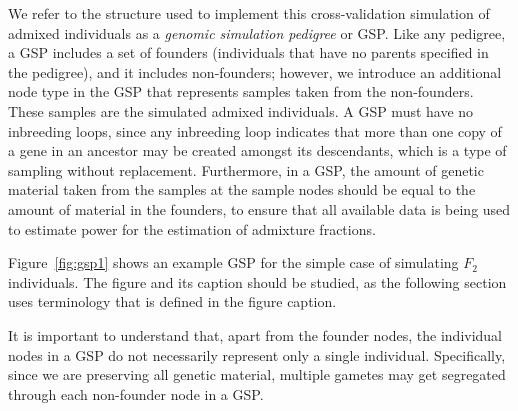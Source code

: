 We refer to the structure used to implement this cross-validation simulation
of admixed individuals as
a {\em genomic simulation pedigree} or GSP.  Like any pedigree,
a GSP includes a set of founders (individuals that have no parents specified in the
pedigree), and it includes non-founders; however, we introduce an additional node
type in the GSP that represents samples taken from the non-founders. These samples
are the simulated admixed individuals.  A GSP must have no inbreeding loops, since
any inbreeding loop indicates that more than one copy of a gene in an ancestor may
be created amongst its descendants, which is a type of sampling without
replacement.  Furthermore, in a GSP, the amount of genetic material taken from the
samples at the sample nodes should be equal to the amount of material in the founders,
to ensure that all available data is being used to estimate power for the estimation of
admixture fractions.

Figure~\ref{fig:gsp1} shows an example GSP for the simple case
of simulating $F_2$ individuals. The figure and its caption
should be studied, as the following section
uses terminology that is defined in the figure caption.

It is important to understand that, apart from the founder nodes, the individual
nodes in a GSP do not necessarily represent only a single individual.  Specifically,
since we are preserving all genetic material, multiple gametes may get segregated
through each non-founder node in a GSP\@.

